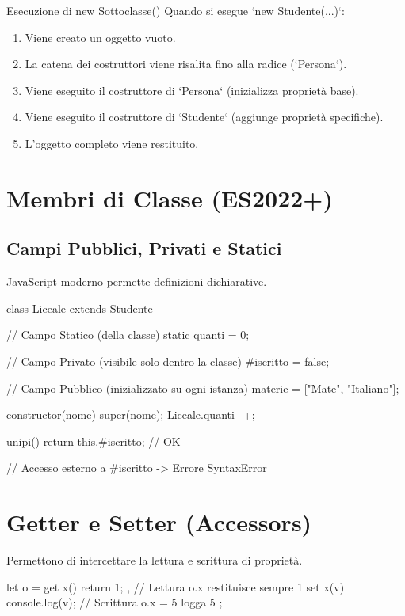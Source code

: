 \begin{algo}{Esecuzione di new Sottoclasse()}
Quando si esegue `new Studente(...)`:
\begin{enumerate}
    \item Viene creato un oggetto vuoto.
    \item La catena dei costruttori viene risalita fino alla radice (`Persona`).
    \item Viene eseguito il costruttore di `Persona` (inizializza proprietà base).
    \item Viene eseguito il costruttore di `Studente` (aggiunge proprietà specifiche).
    \item L'oggetto completo viene restituito.
\end{enumerate}
\end{algo}

\section{Membri di Classe (ES2022+)}

\subsection{Campi Pubblici, Privati e Statici}
JavaScript moderno permette definizioni dichiarative.

\begin{jsbox}[title={Esempio Completo Liceale}]
class Liceale extends Studente {
    // Campo Statico (della classe)
    static quanti = 0;

    // Campo Privato (visibile solo dentro la classe)
    #iscritto = false;

    // Campo Pubblico (inizializzato su ogni istanza)
    materie = ["Mate", "Italiano"];

    constructor(nome) {
        super(nome);
        Liceale.quanti++;
    }

    unipi() { return this.#iscritto; } // OK
    
    // Accesso esterno a #iscritto -> Errore SyntaxError
}
\end{jsbox}

\section{Getter e Setter (Accessors)}
Permettono di intercettare la lettura e scrittura di proprietà.

\begin{jsbox}
let o = {
    get x() { return 1; },      // Lettura o.x restituisce sempre 1
    set x(v) { console.log(v); } // Scrittura o.x = 5 logga 5
};
\end{jsbox}

